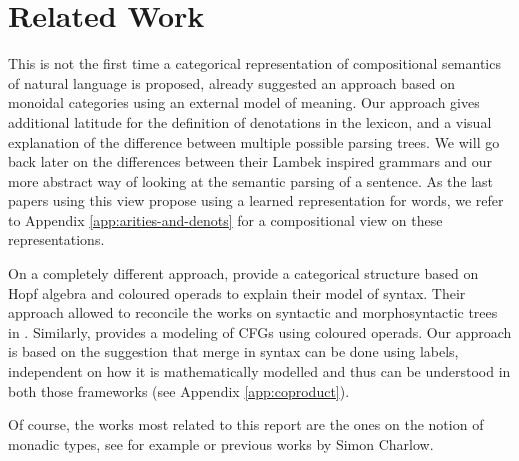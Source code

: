 \section{Related Work}
This is not the first time a categorical representation of compositional
semantics of natural language is proposed,
\cite{coeckeMathematicalFoundationsCompositional2010} already suggested an
approach based on monoidal categories using an external model of meaning.
Our approach gives additional latitude for the definition of denotations in the
lexicon, and a visual explanation of the difference between multiple possible
parsing trees.
We will go back later on the differences between their Lambek inspired grammars
and our more abstract way of looking at the semantic parsing of a sentence.
As the last papers using this view propose using a learned representation for
words, we refer to Appendix \ref{app:arities-and-denots} for a compositional
view on these representations.

\smallskip

On a completely different approach,
\cite{marcollimatildeetchomskynoametberwickrobertc.MathematicalStructureSyntactic}
provide a categorical structure based on Hopf algebra and coloured operads
to explain their model of syntax.
Their approach allowed to reconcile the works on syntactic and morphosyntactic
trees in \cite{senturiaAlgebraicStructureMorphosyntax2025}.
Similarly, \cite{melliesCategoricalContoursChomskySchutzenberger2025} provides
a modeling of CFGs using coloured operads.
Our approach is based on the suggestion that merge in syntax can be done using
labels, independent on how it is mathematically modelled and thus can be
understood in both those frameworks (see Appendix \ref{app:coproduct}).

\smallskip

Of course, the works most related to this report are the ones on the notion of
monadic types, see for example \cite{asudehEnrichedMeaningsNatural2020} or
previous works by Simon Charlow.
